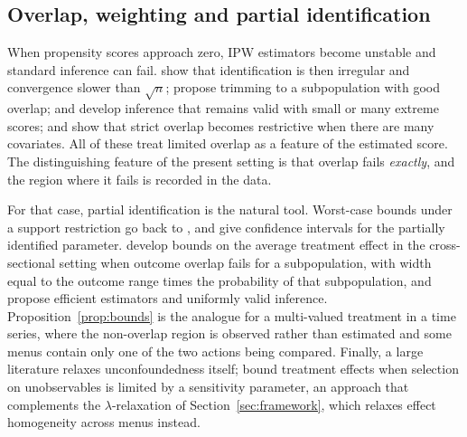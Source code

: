 \subsection{Overlap, weighting and partial identification}

When propensity scores approach zero, IPW estimators become unstable and standard inference can fail.
\citet{khan2010} show that identification is then irregular and convergence slower than $\sqrt{n}$;
\citet{crump2009} propose trimming to a subpopulation with good overlap; \citet{ma2020} and \citet{heiler2021}
develop inference that remains valid with small or many extreme scores; and \citet{damour2021} show that strict
overlap becomes restrictive when there are many covariates. All of these treat limited overlap as a feature of the
estimated score. The distinguishing feature of the present setting is that overlap fails \emph{exactly}, and the
region where it fails is recorded in the data.

For that case, partial identification is the natural tool. Worst-case bounds under a support restriction go back to
\citet{manski1990,manski2003}, and \citet{imbens2004} give confidence intervals for the partially identified
parameter. \citet{susmann2025} develop bounds on the average treatment effect in the cross-sectional setting when
outcome overlap fails for a subpopulation, with width equal to the outcome range times the probability of that
subpopulation, and propose efficient estimators and uniformly valid inference. Proposition~\ref{prop:bounds}
is the analogue for a multi-valued treatment in a time series, where the non-overlap region is observed rather than
estimated and some menus contain only one of the two actions being compared. Finally, a large literature relaxes
unconfoundedness itself; \citet{masten2018} bound treatment effects when selection on unobservables is limited by a
sensitivity parameter, an approach that complements the $\lambda$-relaxation of Section~\ref{sec:framework}, which
relaxes effect homogeneity across menus instead.
